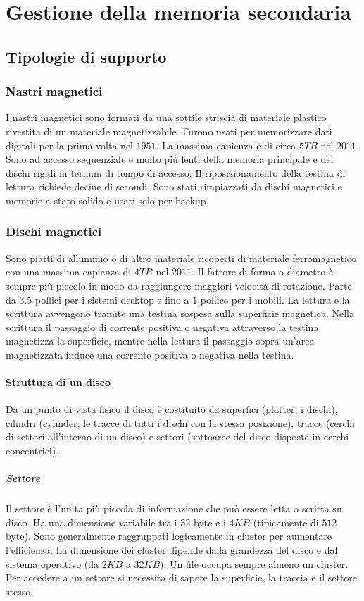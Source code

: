 \chapter{Gestione della memoria secondaria}
\section{Tipologie di supporto}
\subsection{Nastri magnetici}
I nastri magnetici sono formati da una sottile striscia di materiale plastico rivestita di un materiale magnetizzabile. Furono usati per memorizzare dati digitali per la prima volta
nel $1951$. La massima capienza \`e di circa $5TB$ nel $2011$. Sono ad accesso sequenziale e molto pi\`u lenti della memoria principale e dei dischi rigidi in termini di tempo di 
accesso. Il riposizionamento della testina di lettura richiede decine di secondi. Sono stati rimpiazzati da dischi magnetici e memorie a stato solido e usati solo per backup. 
\subsection{Dischi magnetici}
Sono piatti di alluminio o di altro materiale ricoperti di materiale ferromagnetico con una massima capienza di $4TB$ nel $2011$. Il fattore di forma o diametro \`e sempre pi\`u piccolo
in modo da raggiungere maggiori velocit\`a di rotazione. Parte da $3.5$ pollici per i sistemi desktop e fino a $1$ pollice per i mobili. La lettura e la scrittura avvengono tramite una
testina sospesa sulla superficie magnetica. Nella scrittura il passaggio di corrente positiva o negativa attraverso la testina magnetizza la superficie, mentre nella lettura il 
passaggio sopra un'area magnetizzata induce una corrente positiva o negativa nella testina. 
\subsubsection{Struttura di un disco}
Da un punto di vista fisico il disco \`e costituito da superfici (platter, i dischi), cilindri (cylinder, le tracce di tutti i dischi con la stessa posizione), tracce (cerchi di settori
all'interno di un disco) e settori (sottoaree del disco disposte in cerchi concentrici). 
\paragraph{Settore}
Il settore \`e l'unita pi\`u piccola di informazione che pu\`o essere letta o scritta su disco. Ha una dimensione variabile tra i $32$ byte e i $4KB$ (tipicamente di $512$ byte). Sono 
generalmente raggruppati logicamente in cluster per aumentare l'efficienza. La dimensione dei cluster dipende dalla grandezza del disco e dal sistema operativo (da $2KB$ a $32KB$). Un
file occupa sempre almeno un cluster. Per accedere a un settore si necessita di sapere la superficie, la traccia e il settore stesso. 
